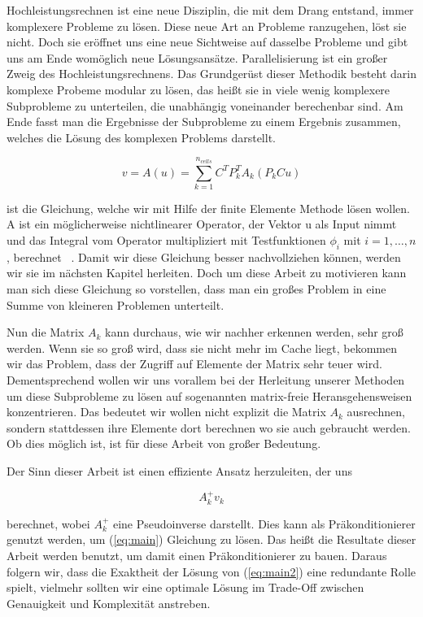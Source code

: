 Hochleistungsrechnen ist eine neue Disziplin, die mit dem Drang entstand, immer komplexere Probleme zu lösen. Diese neue Art an Probleme ranzugehen, löst sie nicht. Doch sie eröffnet uns eine neue Sichtweise auf dasselbe Probleme und gibt uns am Ende womöglich neue Lösungsansätze.
Parallelisierung ist ein großer Zweig des Hochleistungsrechnens. Das Grundgerüst dieser Methodik besteht darin komplexe Probeme modular zu lösen, das heißt sie in viele wenig komplexere Subprobleme zu unterteilen, die unabhängig voneinander berechenbar sind. Am Ende fasst man die Ergebnisse der Subprobleme zu einem Ergebnis zusammen, welches die Lösung des komplexen Problems darstellt.

\begin{equation} \label{eq:main}
v=A(u)=\sum_{k=1}^{n_{cells}} C^T P_k^T A_k (P_k Cu)
\end{equation}

ist die Gleichung, welche wir mit Hilfe der finite Elemente Methode lösen wollen. A ist ein möglicherweise nichtlinearer Operator, der Vektor u als Input nimmt und das Integral vom Operator multipliziert mit  Testfunktionen $\phi_i$ mit $i=1,\dots,n$, berechnet ~\cite[136]{Kronbichler}. Damit wir diese Gleichung besser nachvollziehen können, werden wir sie im nächsten Kapitel herleiten. Doch um diese Arbeit zu motivieren kann man sich diese Gleichung so vorstellen, dass man ein großes Problem in eine Summe von kleineren Problemen unterteilt. 

Nun die Matrix $A_k$ kann durchaus, wie wir nachher erkennen werden, sehr groß werden. Wenn sie so groß wird, dass sie nicht mehr im Cache liegt, bekommen wir das Problem, dass der Zugriff auf Elemente der Matrix sehr teuer wird. Dementsprechend wollen wir uns vorallem bei der Herleitung unserer Methoden um diese Subprobleme zu lösen auf sogenannten matrix-freie Heransgehensweisen konzentrieren. Das bedeutet wir wollen nicht explizit die Matrix $A_k$ ausrechnen, sondern stattdessen ihre Elemente dort berechnen wo sie auch gebraucht werden. Ob dies möglich ist, ist für diese Arbeit von großer Bedeutung. 

Der Sinn dieser Arbeit ist einen effiziente Ansatz herzuleiten, der uns 

\begin{equation} \label{eq:main2}
A_k^{+}v_k
\end{equation}

berechnet, wobei $A_k^{+}$ eine Pseudoinverse darstellt. Dies kann als Präkonditionierer genutzt werden, um (\ref{eq:main}) Gleichung zu lösen. Das heißt die Resultate dieser Arbeit werden benutzt, um damit einen Präkonditionierer zu bauen. Daraus folgern wir, dass die Exaktheit der Lösung von (\ref{eq:main2}) eine redundante Rolle spielt, vielmehr sollten wir eine optimale Lösung im Trade-Off zwischen Genauigkeit und Komplexität anstreben.

